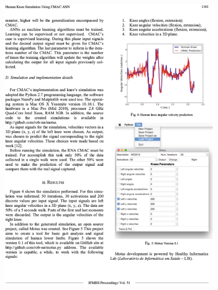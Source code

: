 \begin{apendicesenv}
\begin{figure}[ht]
		\includegraphics[width=17cm]{figuras/wc201503.eps}
	\label{wc201503}
	\end{figure}
	\begin{figure}[ht]
		\centering

\end{figure}
\end{apendicesenv}
